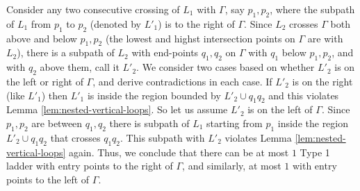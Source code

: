 \documentclass[pdflatex,sn-mathphys-num]{sn-jnl}
\theoremstyle{thmstyleone}
\begin{document}
    Consider any two consecutive crossing of $L_1$ with $\Gamma$, say $p_1,p_2$, where the subpath of $L_1$ from $p_1$ to $p_2$ (denoted by $L'_1$) is to the right of $\Gamma$. Since $L_2$ crosses $\Gamma$ both above and below $p_1,p_2$ (the lowest and highst intersection points on $\Gamma$ are with $L_2$), there is a subpath of $L_2$ with end-points $q_1,q_2$ on $\Gamma$ with $q_1$ below $p_1,p_2$, and with $q_2$ above them, call it $L'_2$. We consider two cases based on whether $L'_2$ is on the left or right of $\Gamma$, and derive contradictions in each case. If $L'_2$ is on the right (like $L'_1$) then $L'_1$ is inside the
    region bounded by $L'_2\cup q_1q_2$ and this violates Lemma \ref{lem:nested-vertical-loops}.
    So let us assume $L'_2$ is on the left of $\Gamma$. Since $p_1,p_2$ are between $q_1,q_2$ there is subpath of $L_1$ starting from $p_1$ inside the region $L'_2\cup q_1q_2$ that crosses $q_1q_2$. This subpath with $L'_2$ violates Lemma \ref{lem:nested-vertical-loops} again.
    Thus, we conclude that there can be at most $1$ Type 1 ladder with entry points to the right of $\Gamma$, and similarly, at most $1$ with entry points to the left of $\Gamma$. 
    
\end{document}
